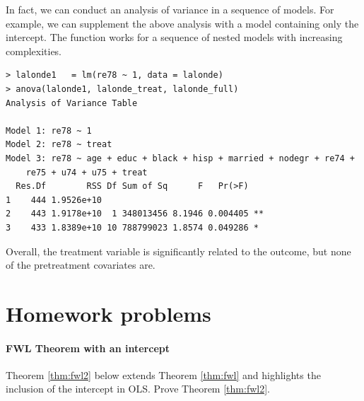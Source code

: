 In fact, we can conduct an analysis of variance in a sequence of models. For example, we can supplement the above analysis with a model containing only the intercept. The function  works for a sequence of nested models with increasing complexities. 
\begin{lstlisting}
> lalonde1   = lm(re78 ~ 1, data = lalonde)
> anova(lalonde1, lalonde_treat, lalonde_full)
Analysis of Variance Table

Model 1: re78 ~ 1
Model 2: re78 ~ treat
Model 3: re78 ~ age + educ + black + hisp + married + nodegr + re74 + 
    re75 + u74 + u75 + treat
  Res.Df        RSS Df Sum of Sq      F   Pr(>F)   
1    444 1.9526e+10                                
2    443 1.9178e+10  1 348013456 8.1946 0.004405 **
3    433 1.8389e+10 10 788799023 1.8574 0.049286 * 
\end{lstlisting}

Overall, the treatment variable is significantly related to the outcome,  but none of the pretreatment covariates are. 

 






\section{Homework problems}

\paragraph{FWL Theorem with an intercept}\label{hw7::fwl-intercept}

Theorem \ref{thm:fwl2} below extends Theorem \ref{thm:fwl} and highlights the inclusion of the intercept in OLS. 
Prove Theorem \ref{thm:fwl2}. 


